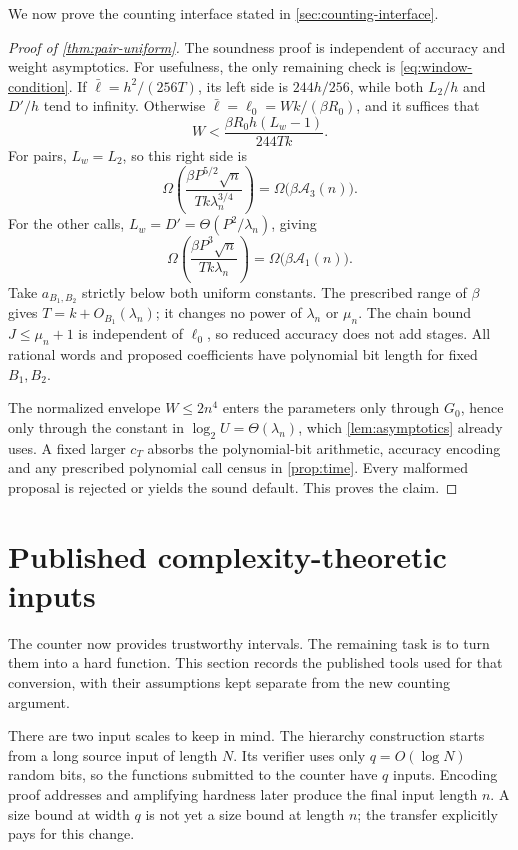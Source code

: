 \documentclass[11pt,letterpaper]{article}
\theoremstyle{definition}
\theoremstyle{remark}
\newcommand{\lgx}{\log_2}
\begin{document}
We now prove the counting interface stated in \cref{sec:counting-interface}.
\begin{proof}[Proof of \cref{thm:pair-uniform}]
The soundness proof is independent of accuracy and weight asymptotics.
For usefulness, the only remaining check is
\eqref{eq:window-condition}. If
\(\bar\ell=h^2/(256T)\), its left side is \(244h/256\), while
both \(L_2/h\) and \(D'/h\) tend to infinity. Otherwise
\(\bar\ell=\ell_0=Wk/(\beta R_0)\), and it suffices that
\[
 W<\frac{\beta R_0h(L_w-1)}{244Tk}.
\]
For pairs, \(L_w=L_2\), so this right side is
\[
 \Omega\!\left(\frac{\beta P^{5/2}\sqrt n}
 {Tk\lambda_n^{3/4}}\right)
 =\Omega\bigl(\beta\mathcal A_3(n)\bigr).
\]
For the other calls, \(L_w=D'=\Theta(P^2/\lambda_n)\), giving
\[
 \Omega\!\left(\frac{\beta P^3\sqrt n}{Tk\lambda_n}\right)
 =\Omega\bigl(\beta\mathcal A_1(n)\bigr).
\]
Take \(a_{B_1,B_2}\) strictly below both uniform constants. The prescribed
range of \(\beta\) gives \(T=k+O_{B_1}(\lambda_n)\); it changes no
power of \(\lambda_n\) or \(\mu_n\). The chain bound
\(J\le\mu_n+1\) is independent of \(\ell_0\), so reduced accuracy
does not add stages. All rational words and proposed coefficients
have polynomial bit length for fixed \(B_1,B_2\).

The normalized envelope \(W\le2n^4\) enters the parameters only through
\(G_0\), hence only through the constant in \(\lgx U=\Theta(\lambda_n)\),
which \cref{lem:asymptotics} already uses. A fixed larger \(c_T\) absorbs
the polynomial-bit arithmetic, accuracy encoding and any prescribed
polynomial call census in \cref{prop:time}. Every malformed proposal
is rejected or yields the sound default. This proves the claim.
\end{proof}


\section{Published complexity-theoretic inputs}\label{sec:imports}

The counter now provides trustworthy intervals. The remaining task
is to turn them into a hard function. This section records the
published tools used for that conversion, with their assumptions
kept separate from the new counting argument.

There are two input scales to keep in mind. The hierarchy construction
starts from a long source input of length \(N\). Its verifier uses
only \(q=O(\log N)\) random bits, so the functions submitted to the
counter have \(q\) inputs. Encoding proof addresses and amplifying
hardness later produce the final input length \(n\). A size bound
at width \(q\) is not yet a size bound at length \(n\); the transfer
explicitly pays for this change.
\end{document}
